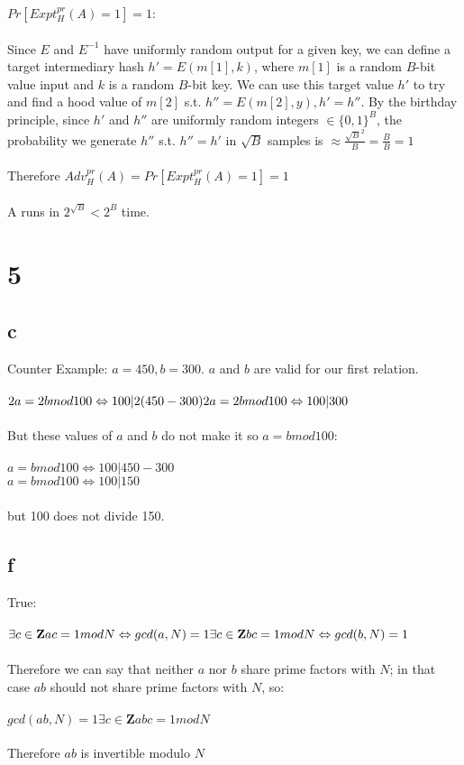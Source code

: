 \documentclass[]{article}
\begin{document}
$Pr[Expt_H^{pr}(A) = 1] = 1$:
\\\\
Since $E$ and $E^{-1}$ have uniformly random output for a given key, we can define a target intermediary hash $h' = E(m[1], k)$, where $m[1]$ is a random $B$-bit value input and $k$ is a random $B$-bit key. We can use this target value $h'$ to try and find a hood value of $m[2]$ s.t. $h'' = E(m[2], y), h' = h''$. By the birthday principle, since $h'$ and $h''$ are uniformly random integers $\in  \{0,1\}^B$, the probability we generate $h''$ s.t. $h'' = h'$ in $\sqrt{B}$ samples is $\approx \frac{\sqrt{B}^2}{B} = \frac{B}{B} = 1$
\\\\
Therefore $Adv_H^{pr}(A) = Pr[Expt_H^{pr}(A) = 1] = 1$
\\\\
A runs in $2^{\sqrt{B}} < 2^B$ time.
\section{5}

\subsection{c}
Counter Example: $a = 450, b = 300$. $a$ and $b$ are valid for our first relation.
\\\\
$2a = 2b mod 100 \Leftrightarrow 100 | 2(450 - 300) \\
 2a = 2b mod 100 \Leftrightarrow 100 | 300$
\\\\
But these values of $a$ and $b$ do not make it so $a = b mod 100$:
\\\\
$a = b mod 100 \Leftrightarrow 100 | 450 - 300$\\
$a = b mod 100 \Leftrightarrow 100 | 150$
\\\\
but 100 does not divide 150.

\subsection{f}
True:
\\\\
$\exists c \in \textbf{Z} ac = 1 mod N \Leftrightarrow gcd(a, N) = 1 \\
 \exists c \in \textbf{Z} bc = 1 mod N \Leftrightarrow gcd(b, N) = 1 \\$
\\\\
Therefore we can say that neither $a$ nor $b$ share prime factors with $N$; in that case $ab$ should not share prime factors with $N$, so:
\\\\
$gcd(ab, N) = 1 \exists c \in \textbf{Z} abc = 1 mod N$
\\\\
Therefore $ab$ is invertible modulo $N$
\end{document}
